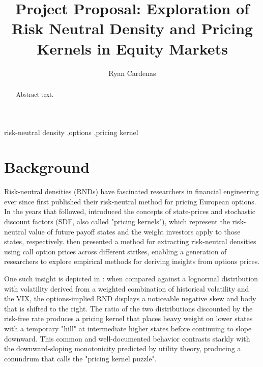 \documentclass[final,3p,times,authoryear]{elsarticle}
\begin{document}
\begin{frontmatter}

    \title{Project Proposal: Exploration of Risk Neutral Density and Pricing Kernels in Equity Markets}

    \author{Ryan Cardenas}

    \begin{abstract}
    Abstract text.
    \end{abstract}

    \begin{keyword} %
    risk-neutral density \sep options \sep pricing kernel
    \end{keyword}
    
\end{frontmatter}


\section{Background}
  \label{background}
  Risk-neutral densities (RNDs) have fascinated researchers in financial engineering ever since \citet{black_pricing_1973} first published their risk-neutral method for pricing European options. In the years that followed, \citet{ross_arbitrage_1976} introduced the concepts of state-prices and stochastic discount factors (SDF, also called "pricing kernels"), which represent the risk-neutral value of future payoff states and the weight investors apply to those states, respectively. \citet{breeden_prices_1978} then presented a method for extracting risk-neutral densities using call option prices across different strikes, enabling a generation of researchers to explore empirical methods for deriving insights from options prices.

  One such insight is depicted in \citet{figlewski_risk-neutral_2018}: when compared against a lognormal distribution with volatility derived from a weighted combination of historical volatility and the VIX, the options-implied RND displays a noticeable negative skew and body that is shifted to the right. The ratio of the two distributions discounted by the risk-free rate produces a pricing kernel that places heavy weight on lower states with a temporary "hill" at intermediate higher states before continuing to slope downward. This common and well-documented behavior contrasts starkly with the downward-sloping monotonicity predicted by utility theory, producing a conundrum that \citet{jackwerth_option-implied_2004} calls the "pricing kernel puzzle".
\end{document}
